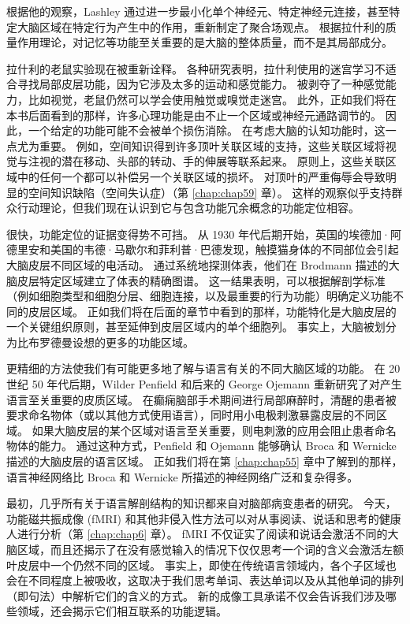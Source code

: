 根据他的观察，Lashley 通过进一步最小化单个神经元、特定神经元连接，甚至特定大脑区域在特定行为产生中的作用，重新制定了聚合场观点。 
根据拉什利的质量作用理论，对记忆等功能至关重要的是大脑的整体质量，而不是其局部成分。


拉什利的老鼠实验现在被重新诠释。 
各种研究表明，拉什利使用的迷宫学习不适合寻找局部皮层功能，因为它涉及太多的运动和感觉能力。 
被剥夺了一种感觉能力，比如视觉，老鼠仍然可以学会使用触觉或嗅觉走迷宫。 
此外，正如我们将在本书后面看到的那样，许多心理功能是由不止一个区域或神经元通路调节的。 
因此，一个给定的功能可能不会被单个损伤消除。 在考虑大脑的认知功能时，这一点尤为重要。 
例如，空间知识得到许多顶叶关联区域的支持，这些关联区域将视觉与注视的潜在移动、头部的转动、手的伸展等联系起来。 
原则上，这些关联区域中的任何一个都可以补偿另一个关联区域的损坏。 
对顶叶的严重侮辱会导致明显的空间知识缺陷（空间失认症）（第 \ref{chap:chap59} 章）。 
这样的观察似乎支持群众行动理论，但我们现在认识到它与包含功能冗余概念的功能定位相容。


很快，功能定位的证据变得势不可挡。 
从 1930 年代后期开始，英国的埃德加·阿德里安和美国的韦德·马歇尔和菲利普·巴德发现，触摸猫身体的不同部位会引起大脑皮层不同区域的电活动。 
通过系统地探测体表，他们在 Brodmann 描述的大脑皮层特定区域建立了体表的精确图谱。 
这一结果表明，可以根据解剖学标准（例如细胞类型和细胞分层、细胞连接，以及最重要的行为功能）明确定义功能不同的皮层区域。 
正如我们将在后面的章节中看到的那样，功能特化是大脑皮层的一个关键组织原则，甚至延伸到皮层区域内的单个细胞列。 
事实上，大脑被划分为比布罗德曼设想的更多的功能区域。


更精细的方法使我们有可能更多地了解与语言有关的不同大脑区域的功能。 
在 20 世纪 50 年代后期，Wilder Penfield 和后来的 George Ojemann 重新研究了对产生语言至关重要的皮质区域。 在癫痫脑部手术期间进行局部麻醉时，清醒的患者被要求命名物体（或以其他方式使用语言），同时用小电极刺激暴露皮层的不同区域。 
如果大脑皮层的某个区域对语言至关重要，则电刺激的应用会阻止患者命名物体的能力。 
通过这种方式，Penfield 和 Ojemann 能够确认 Broca 和 Wernicke 描述的大脑皮层的语言区域。 正如我们将在第 \ref{chap:chap55} 章中了解到的那样，语言神经网络比 Broca 和 Wernicke 所描述的神经网络广泛和复杂得多。


最初，几乎所有关于语言解剖结构的知识都来自对脑部病变患者的研究。 
今天，功能磁共振成像 (fMRI) 和其他非侵入性方法可以对从事阅读、说话和思考的健康人进行分析（第 \ref{chap:chap6} 章）。 
fMRI 不仅证实了阅读和说话会激活不同的大脑区域，而且还揭示了在没有感觉输入的情况下仅仅思考一个词的含义会激活左额叶皮层中一个仍然不同的区域。 
事实上，即使在传统语言领域内，各个子区域也会在不同程度上被吸收，这取决于我们思考单词、表达单词以及从其他单词的排列（即句法）中解析它们的含义的方式。 
新的成像工具承诺不仅会告诉我们涉及哪些领域，还会揭示它们相互联系的功能逻辑。


